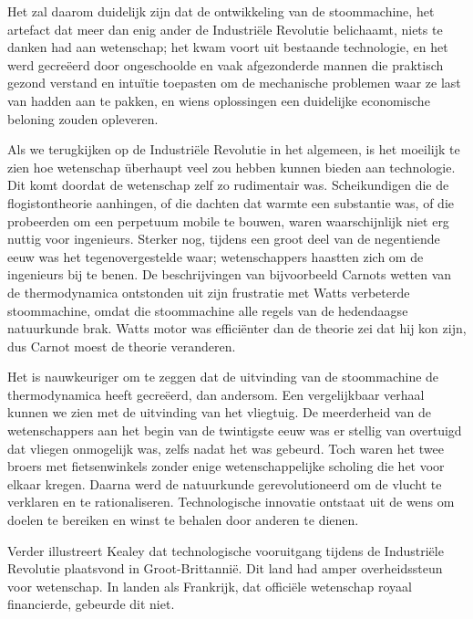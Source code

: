 \begin{blockquotebox}
    Het zal daarom duidelijk zijn dat de ontwikkeling van de stoommachine, het artefact dat meer dan enig ander de Industriële Revolutie belichaamt, niets te danken had aan wetenschap; het kwam voort uit bestaande technologie, en het werd gecreëerd door ongeschoolde en vaak afgezonderde mannen die praktisch gezond verstand en intuïtie toepasten om de mechanische problemen waar ze last van hadden aan te pakken, en wiens oplossingen een duidelijke economische beloning zouden opleveren.
    \par\vspace{1em}\noindent
    Als we terugkijken op de Industriële Revolutie in het algemeen, is het moeilijk te zien hoe wetenschap überhaupt veel zou hebben kunnen bieden aan technologie. Dit komt doordat de wetenschap zelf zo rudimentair was. Scheikundigen die de flogistontheorie aanhingen, of die dachten dat warmte een substantie was, of die probeerden om een perpetuum mobile te bouwen, waren waarschijnlijk niet erg nuttig voor ingenieurs. Sterker nog, tijdens een groot deel van de negentiende eeuw was het tegenovergestelde waar; wetenschappers haastten zich om de ingenieurs bij te benen. De beschrijvingen van bijvoorbeeld Carnots wetten van de thermodynamica ontstonden uit zijn frustratie met Watt\textquotesingle s verbeterde stoommachine, omdat die stoommachine alle regels van de hedendaagse natuurkunde brak. Watt\textquotesingle s motor was efficiënter dan de theorie zei dat hij kon zijn, dus Carnot moest de theorie veranderen.\footnotemark
\end{blockquotebox}
\autocite{79}

Het is nauwkeuriger om te zeggen dat de uitvinding van de stoommachine de thermodynamica heeft gecreëerd, dan andersom. Een vergelijkbaar verhaal kunnen we zien met de uitvinding van het vliegtuig. De meerderheid van de wetenschappers aan het begin van de twintigste eeuw was er stellig van overtuigd dat vliegen onmogelijk was, \autocite{80} zelfs nadat het was gebeurd. Toch waren het twee broers met fietsenwinkels zonder enige wetenschappelijke scholing die het voor elkaar kregen. Daarna werd de natuurkunde gerevolutioneerd om de vlucht te verklaren en te rationaliseren. Technologische innovatie ontstaat uit de wens om doelen te bereiken en winst te behalen door anderen te dienen.

Verder illustreert Kealey dat technologische vooruitgang tijdens de Industriële Revolutie plaatsvond in Groot-Brittannië. Dit land had amper overheidssteun voor wetenschap. In landen als Frankrijk, dat officiële wetenschap royaal financierde, gebeurde dit niet.

